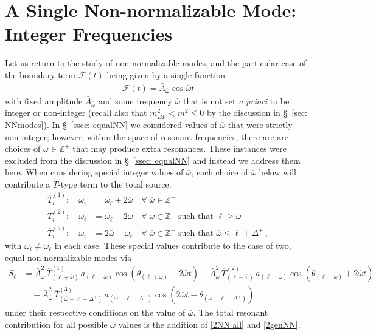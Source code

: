 \documentclass[letterpaper,11pt]{article}
\newcommand{\ol}{\omega_\ell}
\newcommand{\mc}{\mathcal}
\newcommand{\ob}{\overline{\omega}}
\begin{document}
\section{A Single Non-normalizable Mode: Integer Frequencies}
\label{more 2NN}
Let us return to the study of non-normalizable modes, and the particular case of the boundary term $\mc F(t)$ being given by a single function
\begin{align}
	\mc F(t) = \bar A_{\ob} \cos \ob t
\end{align}
with fixed amplitude $\bar A_{\ob}$ and some frequency $\ob$ that is not set \emph{a priori} to be integer or non-integer (recall also that $m^2_{BF} < m^2 \leq 0$ by the discussion in \S\!~\ref{sec: NNmodes}). In \S~\!\ref{ssec: equalNN} we considered values of $\ob$ that were strictly non-integer; however, within the space of resonant frequencies, there are are choices of $\ob \in \mathbb{Z}^+$ that may produce extra resonances. These instances were excluded from the discussion in \S\!~\ref{ssec: equalNN} and instead we address them here. When considering special integer values of $\ob$, each choice of $\ob$ below will contribute a $\overline T$-type term to the total source:
\begin{align}
\label{gen NN res 1}
\overline{T}^{(1)}_{i}: \quad \omega_i &= \ol + 2\ob \quad \forall \; \ob \in \mathbb{Z}^+ \\
\overline{T}^{(2)}_{i}: \quad \omega_i &= \ol - 2\ob \quad \forall \; \ob \in \mathbb{Z}^+ \; \text{such that } \ell \geq \ob \\
\label{gen NN res 2}
\overline{T}^{(3)}_{i}: \quad \omega_i &= 2\ob - \ol \quad \forall \; \ob \in \mathbb{Z}^+ \; \text{such that } \ob \leq \ell + \Delta^+ \, ,
\end{align}
with $\omega_i \neq \omega_\ell$ in each case. These special values contribute to the case of two, equal non-normalizable modes via
\begin{align}
\label{2NN all}
S_\ell &= \bar A^2_{\ob} \, \overline{T}^{(1)}_{(\ell + \ob)} \, a_{(\ell + \ob)} \cos \left( \theta_{(\ell + \ob)} - 2\ob t \right) + \bar A^2_{\ob} \, \overline{T}^{(2)}_{(\ell - \ob)} \, a_{(\ell - \ob)}\cos \left( \theta_{(\ell - \ob)} + 2\ob t \right) \nonumber \\
& \quad + \bar A^2_{\ob} \, \overline{T}^{(3)}_{(\ob - \ell - \Delta^+)} \, a_{(\ob - \ell- \Delta^+)} \cos \left( 2\ob t - \theta_{(\ob - \ell - \Delta^+)} \right) 
\end{align}
under their respective conditions on the value of $\ob$. The total resonant contribution for all possible $\ob$ values is the addition of \eqref{2NN all} and \eqref{2genNN}. 
\end{document}
